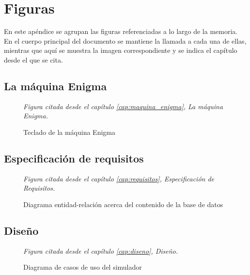 \chapter{Figuras}
\label{apendice_figuras}

En este apéndice se agrupan las figuras referenciadas a lo largo de la memoria. En el cuerpo principal del documento se mantiene la llamada a cada una de ellas, mientras que aquí se muestra la imagen correspondiente y se indica el capítulo desde el que se cita.

\section{La máquina Enigma}

\begin{figure}[H]
	\centerline{}
	\caption{Teclado de la máquina Enigma}
	\label{teclado_enigma}
	\par\smallskip\footnotesize\textit{Figura citada desde el capítulo \ref{cap:maquina_enigma}, La máquina Enigma.}
\end{figure}

\section{Especificación de requisitos}

\begin{figure}[H]
	\centerline{}
	\caption{Diagrama entidad-relación acerca del contenido de la base de datos}
	\label{diagrama_er}
	\par\smallskip\footnotesize\textit{Figura citada desde el capítulo \ref{cap:requisitos}, Especificación de Requisitos.}
\end{figure}

\section{Diseño}

\begin{figure}[H]
	\centerline{}
	\caption{Diagrama de casos de uso del simulador}
	\label{casos_uso_modelo}
	\par\smallskip\footnotesize\textit{Figura citada desde el capítulo \ref{cap:diseno}, Diseño.}
\end{figure}

